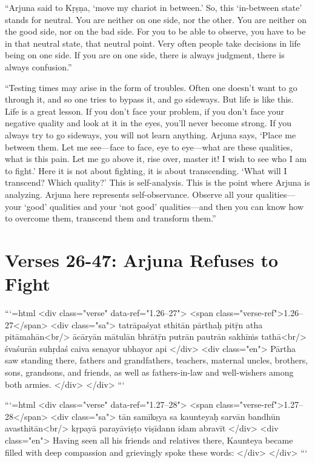 \enquote{Arjuna said to Kṛṣṇa, \enquote{move my chariot in between.} So, this \enquote{in-between state} stands for neutral. You are neither on one side, nor the other. You are neither on the good side, nor on the bad side. For you to be able to observe, you have to be in that neutral state, that neutral point. Very often people take decisions in life being on one side. If you are on one side, there is always judgment, there is always confusion.}

\enquote{Testing times may arise in the form of troubles. Often one doesn’t want to go through it, and so one tries to bypass it, and go sideways. But life is like this. Life is a great lesson. If you don’t face your problem, if you don’t face your negative quality and look at it in the eyes, you’ll never become strong. If you always try to go sideways, you will not learn anything. Arjuna says, \enquote{Place me between them. Let me see---face to face, eye to eye---what are these qualities, what is this pain. Let me go above it, rise over, master it! I wish to see who I am to fight.} Here it is not about fighting, it is about transcending. \enquote{What will I transcend? Which quality?} This is self-analysis. This is the point where Arjuna is analyzing. Arjuna here represents self-observance. Observe all your qualities---your \enquote{good} qualities and your \enquote{not good} qualities---and then you can know how to overcome them, transcend them and transform them.}

\section{Verses 26-47: Arjuna Refuses to Fight}\label{sec-verses-26-47-arjuna-refuses-to-fight}

```{=html}
<div class="verse" data-ref="1.26–27">
  <span class="verse-ref">1.26–27</span>
  <div class="sa">
    tatrāpaśyat sthitān pārthaḥ pitṝn atha pitāmahān<br/>
    ācāryān mātulān bhrātṝn putrān pautrān sakhīṁs tathā<br/>
    śvaśurān suhṛdaś caiva senayor ubhayor api
  </div>
  <div class="en">
    Pārtha saw standing there, fathers and grandfathers, teachers, maternal uncles, brothers, sons, grandsons, and friends, as well as fathers-in-law and well-wishers among both armies.
  </div>
</div>
```



```{=html}
<div class="verse" data-ref="1.27–28">
  <span class="verse-ref">1.27–28</span>
  <div class="sa">
    tān samīkṣya sa kaunteyaḥ sarvān bandhūn avasthitān<br/>
    kṛpayā parayāviṣṭo viṣīdann idam abravīt
  </div>
  <div class="en">
    Having seen all his friends and relatives there, Kaunteya became filled with deep compassion and grievingly spoke these words:
  </div>
</div>
```



